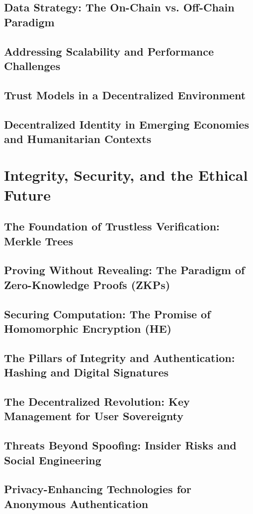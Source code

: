 \documentclass[12pt,a4paper,twoside,openright]{book}
\begin{document}
\chapter{Data Strategy: The On-Chain vs. Off-Chain Paradigm}
\chapter{Addressing Scalability and Performance Challenges}
\chapter{Trust Models in a Decentralized Environment}
\chapter{Decentralized Identity in Emerging Economies and Humanitarian Contexts}

\part{Integrity, Security, and the Ethical Future}
\chapter{The Foundation of Trustless Verification: Merkle Trees}
\chapter{Proving Without Revealing: The Paradigm of Zero-Knowledge Proofs (ZKPs)}
\chapter{Securing Computation: The Promise of Homomorphic Encryption (HE)}
\chapter{The Pillars of Integrity and Authentication: Hashing and Digital Signatures}
\chapter{The Decentralized Revolution: Key Management for User Sovereignty}
\chapter{Threats Beyond Spoofing: Insider Risks and Social Engineering}
\chapter{Privacy-Enhancing Technologies for Anonymous Authentication}
\end{document}
